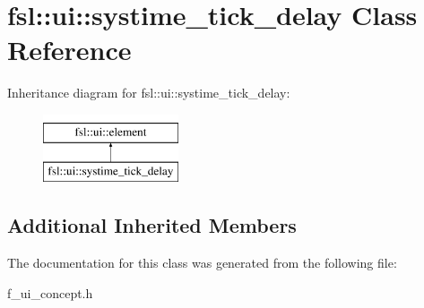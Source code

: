 \hypertarget{classfsl_1_1ui_1_1systime__tick__delay}{}\section{fsl\+::ui\+::systime\+\_\+tick\+\_\+delay Class Reference}
\label{classfsl_1_1ui_1_1systime__tick__delay}
Inheritance diagram for fsl\+::ui\+::systime\+\_\+tick\+\_\+delay\+:\begin{figure}[H]
\begin{center}
\leavevmode
\includegraphics[height=2.000000cm]{classfsl_1_1ui_1_1systime__tick__delay}
\end{center}
\end{figure}
\subsection*{Additional Inherited Members}


The documentation for this class was generated from the following file\+:\begin{DoxyCompactItemize}
\item 
f\+\_\+ui\+\_\+concept.\+h\end{DoxyCompactItemize}
